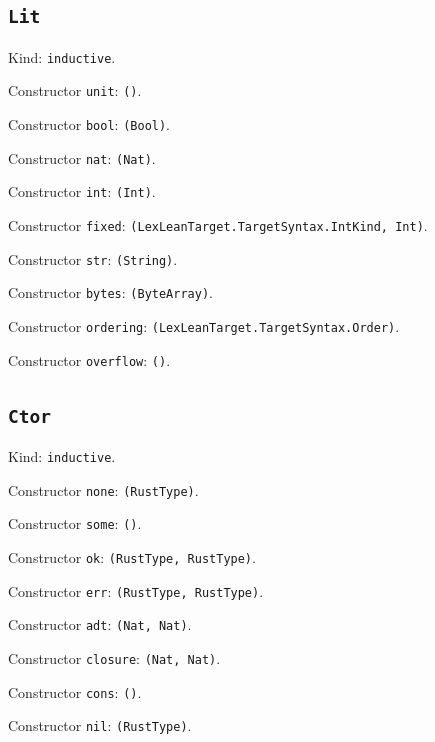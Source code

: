 \documentclass[11pt]{article}
\begin{document}
\subsection*{\texttt{Lit}}
\noindent Kind: \texttt{inductive}.\par
\noindent Constructor \texttt{unit}: \texttt{()}.\par
\noindent Constructor \texttt{bool}: \texttt{(Bool)}.\par
\noindent Constructor \texttt{nat}: \texttt{(Nat)}.\par
\noindent Constructor \texttt{int}: \texttt{(Int)}.\par
\noindent Constructor \texttt{fixed}: \texttt{(LexLeanTarget.TargetSyntax.IntKind, Int)}.\par
\noindent Constructor \texttt{str}: \texttt{(String)}.\par
\noindent Constructor \texttt{bytes}: \texttt{(ByteArray)}.\par
\noindent Constructor \texttt{ordering}: \texttt{(LexLeanTarget.TargetSyntax.Order)}.\par
\noindent Constructor \texttt{overflow}: \texttt{()}.\par
\subsection*{\texttt{Ctor}}
\noindent Kind: \texttt{inductive}.\par
\noindent Constructor \texttt{none}: \texttt{(RustType)}.\par
\noindent Constructor \texttt{some}: \texttt{()}.\par
\noindent Constructor \texttt{ok}: \texttt{(RustType, RustType)}.\par
\noindent Constructor \texttt{err}: \texttt{(RustType, RustType)}.\par
\noindent Constructor \texttt{adt}: \texttt{(Nat, Nat)}.\par
\noindent Constructor \texttt{closure}: \texttt{(Nat, Nat)}.\par
\noindent Constructor \texttt{cons}: \texttt{()}.\par
\noindent Constructor \texttt{nil}: \texttt{(RustType)}.\par
\end{document}

